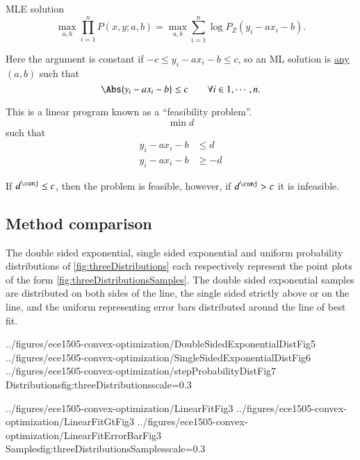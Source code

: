 MLE solution
\begin{dmath}\label{eqn:L1introduction:720}
\max_{a,b} \prod_{i = 1}^n P(x, y; a, b)
=
\max_{a,b} \sum_{i = 1}^n \log P_Z( y_i - a x_i - b ).
\end{dmath}

Here the argument is constant if \( -c \le y_i - a x_i - b \le c \), so an ML solution is \underline{any} \( (a,b) \) such that
\begin{equation}\label{eqn:L1introduction:740}
\Abs{ y_i - a x_i - b } \le c \qquad \forall i \in 1, \cdots, n.
\end{equation}

This is a linear program known as a ``feasibility problem''.
\begin{dmath}\label{eqn:L1introduction:760}
\min d
\end{dmath}
such that
\begin{dmath}\label{eqn:L1introduction:780}
\begin{aligned}
y_i - a x_i - b &\le d \\
y_i - a x_i - b &\ge -d
\end{aligned}
\end{dmath}

If \( d^\conj \le c \), then the problem is feasible, however, if \( d^\conj > c \) it is infeasible.
\subsection{Method comparison}
The double sided exponential, single sided exponential and uniform probability distributions of \cref{fig:threeDistributions} each respectively represent the point plots of the form \cref{fig:threeDistributionsSamples}.  The double sided exponential samples are distributed on both sides of the line, the single sided strictly above or on the line, and the uniform representing error bars distributed around the line of best fit.

\imageThreeFiguresOneLine
{../figures/ece1505-convex-optimization/DoubleSidedExponentialDistFig5}
{../figures/ece1505-convex-optimization/SingleSidedExponentialDistFig6}
{../figures/ece1505-convex-optimization/stepProbabilityDistFig7}
{Distributions}{fig:threeDistributions}{scale=0.3}

\imageThreeFiguresOneLine
{../figures/ece1505-convex-optimization/LinearFitFig3}
{../figures/ece1505-convex-optimization/LinearFitGtFig3}
{../figures/ece1505-convex-optimization/LinearFitErrorBarFig3}
{Samples}{fig:threeDistributionsSamples}{scale=0.3}
